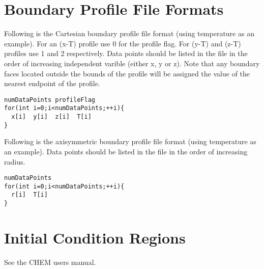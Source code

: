 \documentclass{article}
\begin{document}
\section{Boundary Profile File Formats} \label{appendix:boundaryProfile}

Following is the Cartesian boundary profile file format (using temperature as
an example). For an (x-T) profile use 0 for the profile flag. For (y-T) and
(z-T) profiles use 1 and 2 respectively. Data points should be listed in the
file in the order of increasing independent varible (either x, y or z). Note
that any boundary faces located outside the bounds of the profile will be
assigned the value of the nearest endpoint of the profile.

\begin{verbatim}
numDataPoints profileFlag
for(int i=0;i<numDataPoints;++i){
  x[i]  y[i]  z[i]  T[i]
}
\end{verbatim}

Following is the axisymmetric boundary profile file format (using temperature
as an example). Data points should be listed in the file in the order of
increasing radius.

\begin{verbatim}
numDataPoints
for(int i=0;i<numDataPoints;++i){
  r[i]  T[i]
}
\end{verbatim}

\section{Initial Condition Regions} \label{appendix:initialCondition}

See the CHEM users manual.
\end{document}
